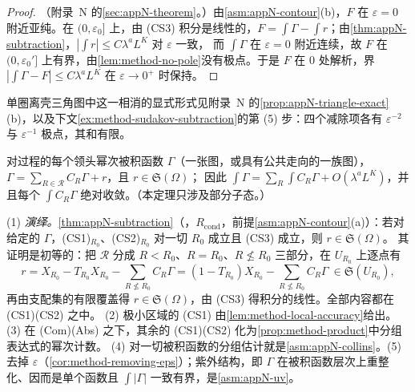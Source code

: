 \begin{proof}
（附录~N 的\cref{sec:appN-theorem}。）由\cref{asm:appN-contour}(b)，$F$ 在 $\varepsilon=0$ 附近亚纯。在 $(0,\varepsilon_0]$ 上，由 (CS3) 积分是线性的，$F=\int\Gamma-\int r$；由\cref{thm:appN-subtraction}，$|\int r|\le C\lambda^aL^K$ 对 $\varepsilon$ 一致，
而 $\int\Gamma$ 在 $\varepsilon=0$ 附近连续，故 $F$ 在 $(0,\varepsilon_0']$ 上有界，由\cref{lem:method-no-pole}没有极点。于是 $F$ 在 $0$ 处解析，界 $|\int\Gamma-F|\le C\lambda^aL^K$ 在 $\varepsilon\to0^+$ 时保持。
\end{proof}

单圈离壳三角图中这一相消的显式形式见附录~N 的\cref{prop:appN-triangle-exact}(b)，以及下文\cref{ex:method-sudakov-subtraction}的第 (5) 步：四个减除项各有 $\varepsilon^{-2}$ 与 $\varepsilon^{-1}$ 极点，其和有限。

\begin{theorem}\label{thm:method-subtraction}
对过程的每个领头幂次被积函数 $\Gamma$（一张图，或具有公共走向的一族图），$\Gamma=\sum_{R\in\mathcal R}C_R\Gamma+r$，且 $r\in\mathfrak S(\Omega)$；
因此 $\int\Gamma=\sum_R\int C_R\Gamma+O(\lambda^aL^K)$，并且每个 $\int C_R\Gamma$ 绝对收敛。（本定理只涉及部分子态。）
\end{theorem}

\begin{proofsketch}
(1) \emph{演绎。}\cref{thm:appN-subtraction}（\tagR，$R_{\mathrm{cond}}$，前提\cref{asm:appN-contour}(a)）：若对给定的 $\Gamma$，(CS1)$_{R_0}$、(CS2)$_{R_0}$ 对一切 $R_0$ 成立且 (CS3) 成立，则 $r\in\mathfrak S(\Omega)$。
其证明是初等的：把 $\mathcal R$ 分成 $R<R_0$、$R=R_0$、$R\not\le R_0$ 三部分，在 $U_{R_0}$ 上逐点有
\begin{equation}\label{eq:method-r-identity}
r=X_{R_0}-T_{R_0}X_{R_0}-\sum_{R\not\le R_0}C_R\Gamma=(1-T_{R_0})X_{R_0}-\sum_{R\not\le R_0}C_R\Gamma\ \in\mathfrak S(U_{R_0}) ,
\end{equation}
再由支配集的有限覆盖得 $r\in\mathfrak S(\Omega)$，由 (CS3) 得积分的线性。全部内容都在 (CS1)(CS2) 之中。
(2) 极小区域的 (CS1) 由\cref{lem:method-local-accuracy}给出。(3) 在 (Com)(Abs) 之下，其余的 (CS1)(CS2) 化为\cref{prop:method-product}中分组表达式的幂次计数。
(4) 对一切被积函数的分组估计就是\cref{asm:appN-collins}。(5) 去掉 $\varepsilon$（\cref{cor:method-removing-eps}）；紫外结构，即 $\Gamma$ 在被积函数层次上重整化、因而是单个函数且 $\int|\Gamma|$ 一致有界，是\cref{asm:appN-uv}。
\end{proofsketch}

